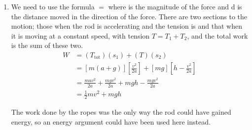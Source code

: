 \begin{problem}
{\begin{enumerate}

\item We need to use the formula  $=$  where  is the magnitude of the force  and d is the distance moved in the direction of the force. There are two sections to the motion; those when the rod is accelerating and the tension is  and that when it is moving at a constant speed, with tension $T = T_{1} + T_{2}$, and the total work is the sum of these two.
	\begin{align*} 
	W &= (T_{\text{tot}})(s_{1}) + (T)(s_{2})  \\ 
	&= \left[m(a + g)\right]\left[\frac{v^{2}}{2a}\right] + \left[mg\right]\left[h - \frac{v^{2}}{2a}\right] \\ 
	&= \frac{mav^{2}}{2a} + \frac{mgv^{2}}{2a} + mgh - \frac{mgv^{2}}{2a} \\ 
	&= \frac{1}{2}mv^{2} + mgh 
	\end{align*}
	
	 The work done by the ropes was the only way the rod could have gained energy, so an energy argument could have been used here instead.
\end{enumerate}}
\end{problem}